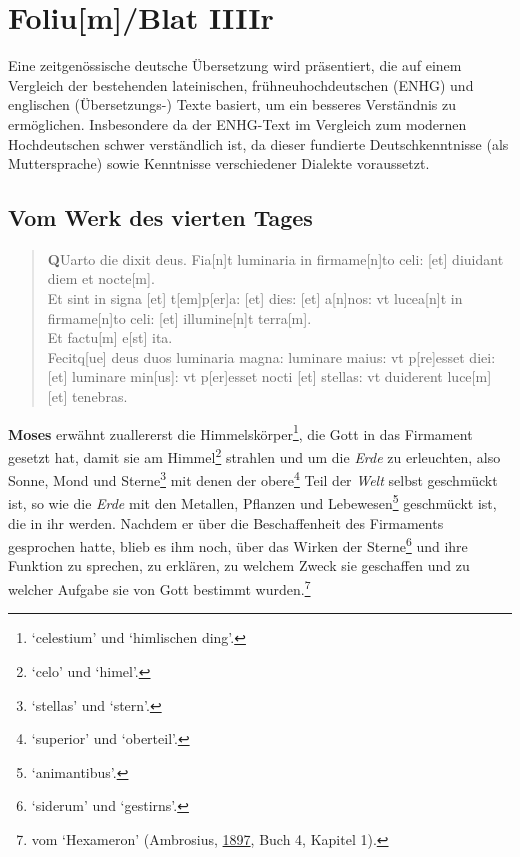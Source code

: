 \documentclass[
]{article}
\author{Dietmar Gerald Schrausser}
\date{09.05.2026}
\begin{document}
\hypertarget{foliumblat-iiiir}{%
\section{Foliu{[}m{]}/Blat IIIIr}\label{foliumblat-iiiir}}

Eine zeitgenössische deutsche Übersetzung wird präsentiert, die auf
einem Vergleich der bestehenden lateinischen, frühneuhochdeutschen
(ENHG) und englischen (Übersetzungs-) Texte basiert, um ein besseres
Verständnis zu ermöglichen. Insbesondere da der ENHG-Text im Vergleich
zum modernen Hochdeutschen schwer verständlich ist, da dieser fundierte
Deutschkenntnisse (als Muttersprache) sowie Kenntnisse verschiedener
Dialekte voraussetzt.

\hypertarget{vom-werk-des-vierten-tages}{%
\subsection{Vom Werk des vierten
Tages}\label{vom-werk-des-vierten-tages}}

\begin{quote}
\textbf{Q}Uarto die dixit deus. Fia{[}n{]}t luminaria in
firmame{[}n{]}to celi: {[}et{]} diuidant diem et nocte{[}m{]}.\\
Et sint in signa {[}et{]} t{[}em{]}p{[}er{]}a: {[}et{]} dies: {[}et{]}
a{[}n{]}nos: vt lucea{[}n{]}t in firmame{[}n{]}to celi: {[}et{]}
illumine{[}n{]}t terra{[}m{]}.\\
Et factu{[}m{]} e{[}st{]} ita.\\
Fecitq{[}ue{]} deus duos luminaria magna: luminare maius: vt
p{[}re{]}esset diei: {[}et{]} luminare min{[}us{]}: vt p{[}er{]}esset
nocti {[}et{]} stellas: vt duiderent luce{[}m{]} {[}et{]} tenebras.
\end{quote}

\textbf{Moses} erwähnt zuallererst die Himmelskörper\footnote{`celestium'
  und `himlischen ding'.}, die Gott in das Firmament gesetzt hat, damit
sie am Himmel\footnote{`celo' und `himel'.} strahlen und um die
\emph{Erde} zu erleuchten, also Sonne, Mond und Sterne\footnote{`stellas'
  und `stern'.} mit denen der obere\footnote{`superior' und `oberteil'.}
Teil der \emph{Welt} selbst geschmückt ist, so wie die \emph{Erde} mit
den Metallen, Pflanzen und Lebewesen\footnote{`animantibus'.} geschmückt
ist, die in ihr werden. Nachdem er über die Beschaffenheit des
Firmaments gesprochen hatte, blieb es ihm noch, über das Wirken der
Sterne\footnote{`siderum' und `gestirns'.} und ihre Funktion zu
sprechen, zu erklären, zu welchem \hspace{0pt}\hspace{0pt}Zweck sie
geschaffen und zu welcher Aufgabe sie von Gott bestimmt
wurden.\footnote{vom `Hexameron' (Ambrosius,
  \href{https://books.google.com/books?id=L1DbnAAACAAJ}{1897}, Buch 4,
  Kapitel 1).}
\end{document}
